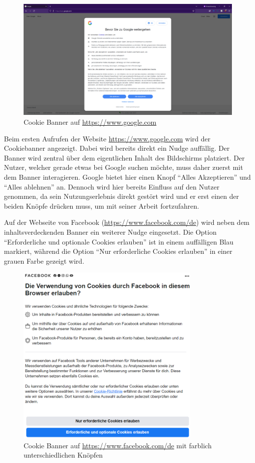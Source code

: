 \begin{figure}[ht]
    \centering
    \includegraphics[width=1\textwidth]{Bilder/Google_Banner.png}
    \caption{Cookie Banner auf \url{https://www.google.com}}
    \label{fig:Google-Cookie}
\end{figure}

Beim ersten Aufrufen der Website \url{https://www.google.com} wird der Cookiebanner angezeigt. Dabei wird bereits direkt ein Nudge auffällig. Der Banner wird zentral über dem eigentlichen Inhalt des Bildschirms platziert. Der Nutzer, welcher gerade etwas bei Google suchen möchte, muss daher zuerst mit dem Banner interagieren. Google bietet hier einen Knopf ``Alles Akzeptieren'' und ``Alles ablehnen'' an. Dennoch wird hier bereits Einfluss auf den Nutzer genommen, da sein Nutzungserlebnis direkt gestört wird und er erst einen der beiden Knöpfe drücken muss, um mit seiner Arbeit fortzufahren.

Auf der Webseite von Facebook (\url{https://www.facebook.com/de}) wird neben dem inhaltsverdeckenden Banner ein weiterer Nudge eingesetzt. Die Option ``Erforderliche und optionale Cookies erlauben'' ist in einem auffälligen Blau markiert, während die Option ``Nur erforderliche Cookies erlauben'' in einer grauen Farbe gezeigt wird.

\begin{figure}[ht]
    \centering
    \includegraphics[width=0.8\textwidth]{Bilder/Facebook_Banner.png}
    \caption{Cookie Banner auf \url{https://www.facebook.com/de} mit farblich unterschiedlichen Knöpfen}
    \label{fig:Facebook-Cookie}
\end{figure}

